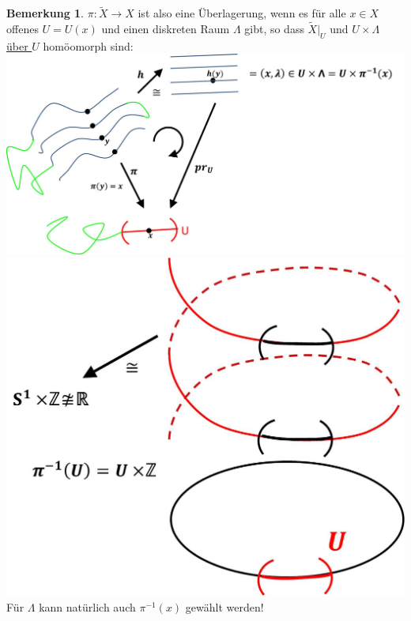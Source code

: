 \documentclass[a4paper,11pt,notitlepage]{report}
\theoremstyle{definition}
\newtheorem{remark}{Bemerkung}[chapter]
\begin{document}
\begin{remark}
	$\pi \colon \tilde{X} \rightarrow X$ ist also eine Überlagerung, wenn es für alle $x \in X$ offenes $U=U(x)$ und einen diskreten Raum $\Lambda$ gibt, so dass $\tilde{X} \big |_U$ und $U \times \Lambda$ \underline{über $U$} homöomorph sind:
	\includegraphics[scale=0.4]{images/lokal_trivialisierend.jpg} \newline
	\includegraphics[scale=0.4]{images/lokal_trivialisierend2.jpg} \newline
	Für $\Lambda$ kann natürlich auch $\pi^{-1}(x)$ gewählt werden!
\end{remark}
\end{document}
